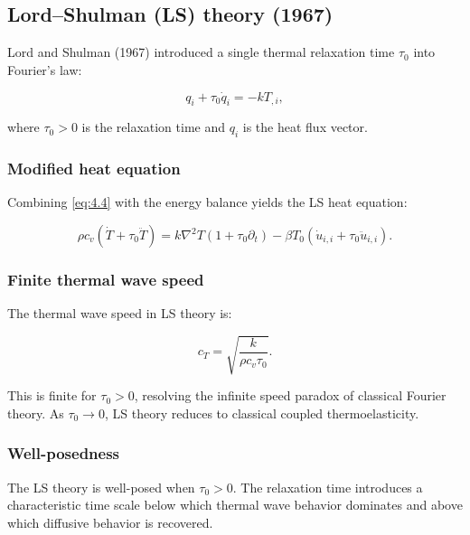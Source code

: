 \subsection{Lord--Shulman (LS) theory (1967)}
\label{sec:4.3}

Lord and Shulman (1967) introduced a single thermal relaxation time $\tau_0$ into Fourier's law:

\begin{equation}
q_i + \tau_0 \dot{q}_i = -k T_{,i},
\label{eq:4.4}
\end{equation}

where $\tau_0 > 0$ is the relaxation time and $q_i$ is the heat flux vector.

\subsubsection{Modified heat equation}

Combining \eqref{eq:4.4} with the energy balance yields the LS heat equation:

\begin{equation}
\rho c_v \left(\dot{T} + \tau_0 \ddot{T}\right)
= k\nabla^2 T (1 + \tau_0 \partial_t)
- \beta T_0 (\dot{u}_{i,i} + \tau_0 \ddot{u}_{i,i}).
\label{eq:4.5}
\end{equation}

\subsubsection{Finite thermal wave speed}

The thermal wave speed in LS theory is:

\begin{equation}
c_T = \sqrt{\frac{k}{\rho c_v \tau_0}}.
\label{eq:4.6}
\end{equation}

This is finite for $\tau_0 > 0$, resolving the infinite speed paradox of classical Fourier theory. As $\tau_0 \to 0$, LS theory reduces to classical coupled thermoelasticity.

\subsubsection{Well-posedness}

The LS theory is well-posed when $\tau_0 > 0$. The relaxation time introduces a characteristic time scale below which thermal wave behavior dominates and above which diffusive behavior is recovered.

